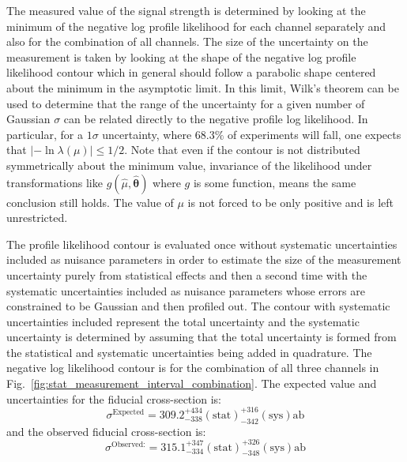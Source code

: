 The measured value of the signal strength is determined by looking 
at the minimum 
of the negative log profile likelihood for each channel separately and also 
for the combination of all channels. The size of the uncertainty on the 
measurement is taken by looking at the shape of the negative log 
profile likelihood contour which in general should follow a parabolic
shape centered about the minimum in the asymptotic limit. In this limit,
Wilk's theorem \cite{Wilk:1938}
can be used \cite{PDG:2014}
to determine that
the range of the 
uncertainty for a given number of Gaussian $\sigma$ can be related
directly 
to the negative profile log likelihood.  In particular, for 
a $1\sigma$ uncertainty, where $68.3\%$ of experiments will fall, 
one expects that 
$|-\ln \lambda(\mu)| \leq 1/2$.
Note that even if the contour is not distributed symmetrically about 
the minimum
value, invariance of the likelihood under 
transformations like $g(\hat{\mu},\hat{\boldsymbol{\theta}})$ where $g$ is some function, 
means the same conclusion still holds.
The value of $\mu$ is not forced to be only positive and is 
left unrestricted. 

The profile likelihood contour is evaluated once without 
systematic uncertainties included
as nuisance parameters in order to estimate the size of the 
measurement uncertainty purely 
from statistical effects and then a second time with the 
systematic uncertainties included
as nuisance parameters whose errors are constrained to be Gaussian and then 
profiled out. The contour with systematic uncertainties included represent
the total uncertainty and the systematic uncertainty is determined by 
assuming that
the total uncertainty is formed from the statistical and systematic 
uncertainties being added
in quadrature.
The negative log likelihood contour is 
for the combination of all three channels in 
Fig.~\ref{fig:stat_measurement_interval_combination}.
The expected value and uncertainties for the fiducial cross-section is:
\begin{equation}
\sigma^{\textrm{Expected}} = 309.2  ^{+434}_{-338} (\textrm{stat}) ^{+316}_{-342} (\textrm{sys}) \textrm{ab}
\end{equation}
and the observed fiducial cross-section is:
\begin{equation}
\sigma^{\textrm{Observed:}} = 315.1  ^{+347}_{-334} (\textrm{stat}) ^{+326}_{-348} (\textrm{sys}) \textrm{ab}
\end{equation}

